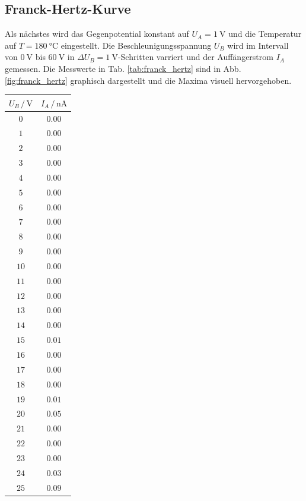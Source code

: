 \subsection{Franck-Hertz-Kurve}
Als nächstes wird das Gegenpotential konstant auf $U_A = \SI{1}{\volt}$ und die Temperatur auf $T = \SI{180}{\degreeCelsius}$ eingestellt.
Die Beschleunigungsspannung $U_B$ wird im Intervall von $\SI{0}{\volt}$ bis $\SI{60}{\volt}$ in $\Delta U_B = \SI{1}{\volt}$-Schritten varriert und der Auffängerstrom $I_A$ gemessen.
Die Messwerte in Tab. \ref{tab:franck_hertz} sind in Abb. \ref{fig:franck_hertz} graphisch dargestellt und die Maxima visuell hervorgehoben.
\begin{table}
    \centering
    \begin{tabular}{cc|}
        \toprule
        $U_B \,/\, \si{\volt}$ & $I_A \,/\, \si{\nano\ampere}$ \\
        \midrule
        $0$ & $0.00$ \\
        $1$ & $0.00$ \\
        $2$ & $0.00$ \\
        $3$ & $0.00$ \\
        $4$ & $0.00$ \\
        $5$ & $0.00$ \\
        $6$ & $0.00$ \\
        $7$ & $0.00$ \\
        $8$ & $0.00$ \\
        $9$ & $0.00$ \\
        $10$ & $0.00$ \\
        $11$ & $0.00$ \\
        $12$ & $0.00$ \\
        $13$ & $0.00$ \\
        $14$ & $0.00$ \\
        $15$ & $0.01$ \\
        $16$ & $0.00$ \\
        $17$ & $0.00$ \\
        $18$ & $0.00$ \\
        $19$ & $0.01$ \\
        $20$ & $0.05$ \\
        $21$ & $0.00$ \\
        $22$ & $0.00$ \\
        $23$ & $0.00$ \\
        $24$ & $0.03$ \\
        $25$ & $0.09$ \\

\end{tabular}
\end{table}
